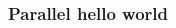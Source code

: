 \documentclass[usenames,dvipsnames,mathserif,compress]{beamer}
\begin{document}
\begin{frame}[fragile]
  \frametitle{Parallel hello world}
  
\end{frame}

\begin{frame}[fragile]
  \begin{columns}
    \begin{column}{1.05\textwidth}
  
    \end{column}
  \end{columns}
\end{frame}









\end{document}
